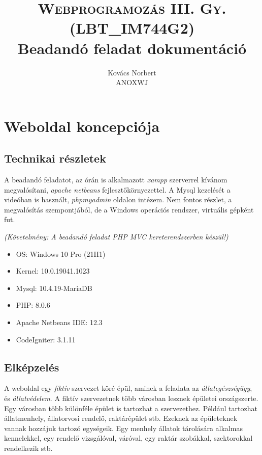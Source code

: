 \documentclass[a4paper,12pt]{article}
\begin{document}
\title{\textsc{Webprogramozás III. Gy. \\ {\normalsize (LBT\_IM744G2)}} \\ {\normalsize Beadandó feladat dokumentáció}}
\author{Kovács Norbert \\ ANOXWJ}
\maketitle
\newpage
\tableofcontents
\newpage


\section{Weboldal koncepciója}
\subsection{Technikai részletek}
A beadandó feladatot, az órán is alkalmazott \textit{xampp} szerverrel kívánom megvalósítani, \textit{apache netbeans} fejlesztőkörnyezettel. A Mysql kezelését a videóban is használt, \textit{phpmyadmin} oldalon intézem. Nem fontos részlet, a megvalósítás szempontjából, de a Windows operációs rendszer, virtuális gépként fut.

\begin{center}
	\textit{{\footnotesize (Követelmény: A beadandó feladat PHP MVC kereterendszerben készül!)}}
\end{center}

\begin{itemize}
	\item OS: Windows 10 Pro (21H1)
	\item Kernel: 10.0.19041.1023
	\item Mysql: 10.4.19-MariaDB
	\item PHP: 8.0.6
	\item Apache Netbeans IDE: 12.3
	\item CodeIgniter: 3.1.11
\end{itemize}

\subsection{Elképzelés}
A weboldal egy \textit{fiktív} szervezet köré épül, aminek a feladata  az \textit{állategészségügy}, és \textit{állatvédelem}. A fiktív szervezetnek több városban lesznek épületei országszerte. Egy városban több különféle épület is tartozhat a szervezethez. Például tartozhat állatmenhely, állatorvosi rendelő, raktárépület stb. Ezeknek az épületeknek vannak hozzájuk tartozó egységeik. Egy menhely állatok tárolására alkalmas kennelekkel, egy rendelő vizsgálóval, váróval, egy raktár szobákkal, szektorokkal rendelkezik stb.
\end{document}
